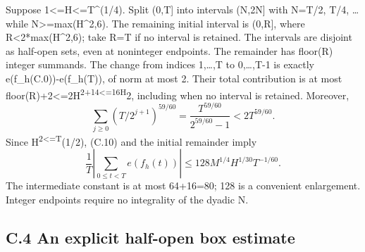 \documentclass[11pt,a4paper]{article}
\begin{document}
Suppose 1\textless=H\textless=T\^{}(1/4). Split (0,T{]} into intervals
(N,2N{]} with N=T/2, T/4, \ldots{} while N\textgreater=max(H\^{}2,6).
The remaining initial interval is (0,R{]}, where
R\textless2*max(H\^{}2,6); take R=T if no interval is retained. The
intervals are disjoint as half-open sets, even at noninteger endpoints.
The remainder has floor(R) integer summands. The change from indices
1,\ldots,T to 0,\ldots,T-1 is exactly e(f\_h(C.0))-e(f\_h(T)), of norm
at most 2. Their total contribution is at most
floor(R)+2\textless=2H\textsuperscript{2+14\textless=16H}2, including
when no interval is retained. Moreover, \[
\sum_{j\ge0}(T/2^{j+1})^{59/60}
=\frac{T^{59/60}}{2^{59/60}-1}<2T^{59/60}.
\] Since H\textsuperscript{2\textless=T}(1/2), (C.10) and the initial
remainder imply \[
\frac1T\left|\sum_{0\le t<T}e(f_h(t))\right|
\le128M^{1/4}H^{1/30}T^{-1/60}. \tag{C.11}
\] The intermediate constant is at most 64+16=80; 128 is a convenient
enlargement. Integer endpoints require no integrality of the dyadic N.

\subsection{C.4 An explicit half-open box
estimate}\label{c.4-an-explicit-half-open-box-estimate}
\end{document}
